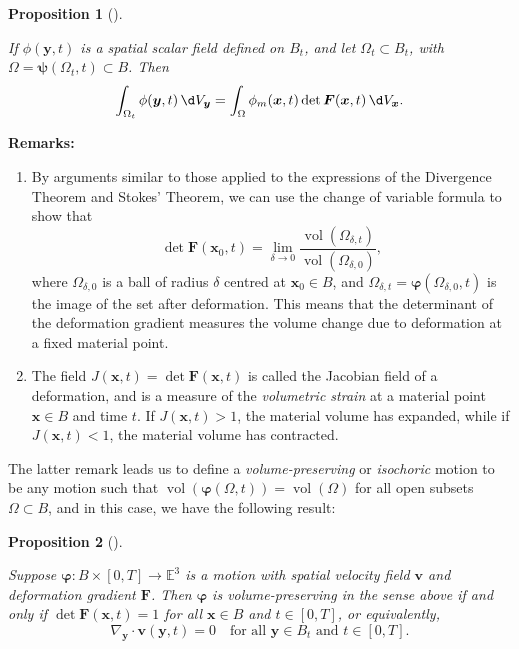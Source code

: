 \documentclass[
  letterpaper,
  DIV=11,
  numbers=noendperiod]{scrreprt}
\theoremstyle{plain}
\newtheorem{proposition}{Proposition}[chapter]
\theoremstyle{remark}
\begin{document}
\begin{proposition}[]\protect\hypertarget{prp-TransformationOfVolumeIntegrals}{}\label{prp-TransformationOfVolumeIntegrals}

If \(\phi({\boldsymbol{y}},t)\) is a spatial scalar field defined on
\(B_t\), and let \(\Omega_t\subset B_t\), with
\(\Omega = {\boldsymbol{\psi}}(\Omega_t,t)\subset B\). Then
\[\int_{\Omega_t}\phi({\boldsymbol{y}},t){\,\d V_{{\boldsymbol{y}}}}= \int_\Omega \phi_m({\boldsymbol{x}},t)\det{\boldsymbol{F}}({\boldsymbol{x}},t){\,\d V_{{\boldsymbol{x}}}}.\]

\end{proposition}

\textbf{Remarks:}

\begin{enumerate}
\def\labelenumi{\arabic{enumi}.}
\item
  By arguments similar to those applied to the expressions of the
  Divergence Theorem and Stokes' Theorem, we can use the change of
  variable formula to show that
  \[\det {\boldsymbol{F}}({\boldsymbol{x}}_0,t) = \lim_{\delta\to 0} \frac{{\operatorname{vol}}(\Omega_{\delta,t})}{{\operatorname{vol}}(\Omega_{\delta,0})},\]
  where \(\Omega_{\delta,0}\) is a ball of radius \(\delta\) centred at
  \({\boldsymbol{x}}_0\in B\), and
  \(\Omega_{\delta,t} = {\boldsymbol{\varphi}}(\Omega_{\delta,0},t)\) is
  the image of the set after deformation. This means that the
  determinant of the deformation gradient measures the volume change due
  to deformation at a fixed material point.
\item
  The field
  \(J({\boldsymbol{x}},t) = \det {\boldsymbol{F}}({\boldsymbol{x}},t)\)
  is called the Jacobian field of a deformation, and is a measure of the
  \emph{volumetric strain} at a material point \({\boldsymbol{x}}\in B\)
  and time \(t\). If \(J({\boldsymbol{x}},t)>1\), the material volume
  has expanded, while if \(J({\boldsymbol{x}},t)<1\), the material
  volume has contracted.
\end{enumerate}

The latter remark leads us to define a \emph{volume-preserving} or
\emph{isochoric} motion to be any motion such that
\({\operatorname{vol}}({\boldsymbol{\varphi}}(\Omega,t))={\operatorname{vol}}(\Omega)\)
for all open subsets \(\Omega\subset B\), and in this case, we have the
following result:

\begin{proposition}[]\protect\hypertarget{prp-volumepreserving}{}\label{prp-volumepreserving}

Suppose \({\boldsymbol{\varphi}}:B\times[0,T]\to{\mathbb{E}}^3\) is a
motion with spatial velocity field \({\boldsymbol{v}}\) and deformation
gradient \({\boldsymbol{F}}\). Then \({\boldsymbol{\varphi}}\) is
volume-preserving in the sense above if and only if
\(\det{\boldsymbol{F}}({\boldsymbol{x}},t) = 1\) for all
\({\boldsymbol{x}}\in B\) and \(t\in[0,T]\), or equivalently,
\[\nabla_{\boldsymbol{y}}\cdot{\boldsymbol{v}}({\boldsymbol{y}},t) = 0\quad\text{for all }{\boldsymbol{y}}\in B_t\text{ and }t\in[0,T].\]

\end{proposition}
\end{document}
